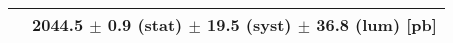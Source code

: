 \begin{tabular}{lc}
\hline
                               & 2044.5 $\pm$ 0.9 (stat) $\pm$ 19.5 (syst) $\pm$ 36.8 (lum) [pb]  \\
\hline
\end{tabular}
